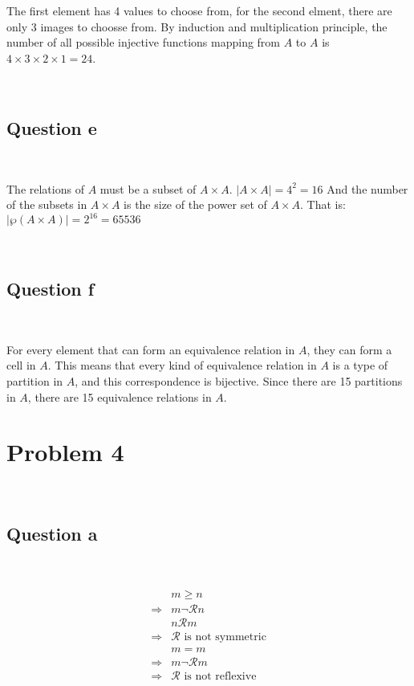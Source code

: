 \documentclass{article}
\begin{document}
The first element has 4 values to choose from, for the second elment, there are only 3 images to choosse from. By induction and multiplication principle, the number of all possible injective functions mapping from $A$ to $A$ is $4\times3\times2\times1=24$.

~

\subsection*{Question e}

~

The relations of $A$ must be a subset of $A\times A$. $|A \times A|=4^2=16$ And the number of the subsets in $A\times A$ is the size of the power set of $A\times A$. That is: $|\wp(A\times A)|=2^{16}=65536$

~

\subsection*{Question f}

~

For every element that can form an equivalence relation in $A$, they can form a cell in $A$. This means that every kind of equivalence relation in $A$ is a type of partition in $A$, and this correspondence is bijective. Since there are 15 partitions in $A$, there are 15 equivalence relations in $A$.

\newpage

\section*{Problem 4}

~

\subsection*{Question a}

~

\begin{equation*}
    \begin{split}
        &m\geqslant n\\
        \Rightarrow&m\lnot \mathcal{R} n\\
        &n\mathcal{R}m\\
        \Rightarrow&\mathcal{R}\text{ is not symmetric}\\
        &m=m\\
        \Rightarrow&m\lnot \mathcal{R} m\\
        \Rightarrow&\mathcal{R}\text{ is not reflexive}\\
    \end{split}
\end{equation*}
\end{document}
